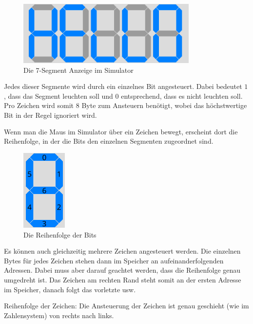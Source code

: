 \begin{figure}[ht]
	\centering
  \includegraphics[width=0.8\textwidth]{Images/7-Segment_Hello}
	\caption{Die 7-Segment Anzeige im Simulator}
	\label{7-Segment}
\end{figure}

Jedes dieser Segmente wird durch ein einzelnes Bit angesteuert. Dabei bedeutet $1$, dass das Segment leuchten soll und $0$ entsprechend, dass es nicht leuchten soll.
Pro Zeichen wird somit 8 Byte zum Ansteuern benötigt, wobei das höchstwertige Bit in der Regel ignoriert wird.

Wenn man die Maus im Simulator über ein Zeichen bewegt, erscheint dort die Reihenfolge, in der die Bits den einzelnen Segmenten zugeordnet sind.

\begin{figure}[ht]
	\centering
  \includegraphics[width=0.2\textwidth]{Images/7-Segment_Hover}
	\caption{Die Reihenfolge der Bits}
	\label{7-Segment_Hover}
\end{figure}

Es können auch gleichzeitig mehrere Zeichen angesteuert werden. Die einzelnen Bytes für jedes Zeichen stehen dann im Speicher an aufeinanderfolgenden Adressen.
Dabei muss aber darauf geachtet werden, dass die Reihenfolge genau umgedreht ist. Das Zeichen am rechten Rand steht somit an der ersten Adresse im Speicher, 
danach folgt das vorletzte usw.

\begin{warningblock}
Reihenfolge der Zeichen: Die Ansteuerung der Zeichen ist genau geschieht (wie im Zahlensystem) von rechts nach links. 
\end{warningblock}

